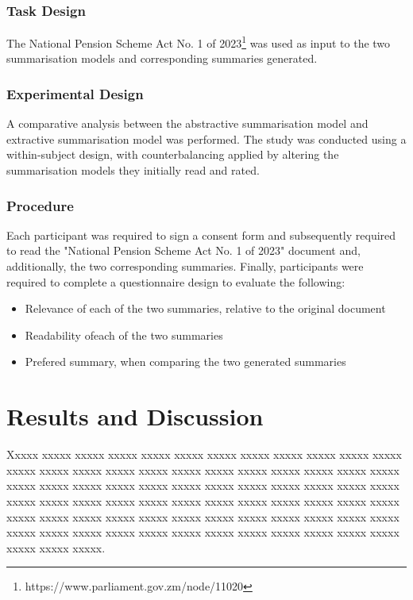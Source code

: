 \documentclass[conference]{IEEEtran}
\begin{document}
\subsubsection{Task Design}
\label{sec:methodology:summarisation_models_analysis:task_design}
The National Pension Scheme Act No. 1 of 2023\footnote{https://www.parliament.gov.zm/node/11020} was used as input to the two summarisation models and corresponding summaries generated.

\subsubsection{Experimental Design}
\label{sec:methodology:summarisation_models_analysis:experimental_design}
A comparative analysis between the abstractive summarisation model and extractive summarisation model was performed. The study was conducted using a within-subject design, with counterbalancing applied by altering the summarisation models they initially read and rated.

\subsubsection{Procedure}
\label{sec:methodology:summarisation_models_analysis:procedure}
Each participant was required to sign a consent form and subsequently required to read the "National Pension Scheme Act No. 1 of 2023" document and, additionally, the two corresponding summaries. Finally, participants were required to complete a questionnaire design to evaluate the following:
\begin{itemize}
    \item Relevance of each of the two summaries, relative to the original document
    \item Readability ofeach of the two summaries
    \item Prefered summary, when comparing the two generated summaries
\end{itemize}

\section{Results and Discussion}
\label{sec:results_and_discussion}
Xxxxx xxxxx xxxxx  xxxxx  xxxxx  xxxxx  xxxxx  xxxxx  xxxxx  xxxxx  xxxxx  xxxxx  xxxxx  xxxxx  xxxxx  xxxxx  xxxxx  xxxxx  xxxxx  xxxxx  xxxxx  xxxxx  xxxxx  xxxxx  xxxxx  xxxxx  xxxxx  xxxxx  xxxxx  xxxxx  xxxxx  xxxxx  xxxxx  xxxxx  xxxxx  xxxxx  xxxxx  xxxxx  xxxxx  xxxxx  xxxxx  xxxxx  xxxxx  xxxxx  xxxxx  xxxxx  xxxxx  xxxxx  xxxxx  xxxxx  xxxxx  xxxxx  xxxxx  xxxxx  xxxxx  xxxxx  xxxxx  xxxxx  xxxxx  xxxxx  xxxxx  xxxxx  xxxxx  xxxxx  xxxxx  xxxxx  xxxxx  xxxxx  xxxxx  xxxxx  xxxxx  xxxxx  xxxxx  xxxxx  xxxxx.
\end{document}
